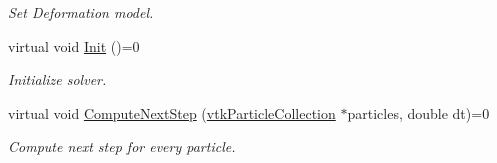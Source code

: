 \begin{DoxyCompactItemize}
\begin{DoxyCompactList}\small\item\em Set Deformation model. \item\end{DoxyCompactList}\item 
virtual void \hyperlink{classvtkMotionEquationSolver_a32129d91bbd906d394f40626c0772d15}{Init} ()=0
\begin{DoxyCompactList}\small\item\em Initialize solver. \item\end{DoxyCompactList}\item 
virtual void \hyperlink{classvtkMotionEquationSolver_a1b355adf0c7ce01e51d91fd499f0c15b}{ComputeNextStep} (\hyperlink{classvtkParticleCollection}{vtkParticleCollection} $\ast$particles, double dt)=0
\begin{DoxyCompactList}\small\item\em Compute next step for every particle. \item\end{DoxyCompactList}\end{DoxyCompactItemize}
